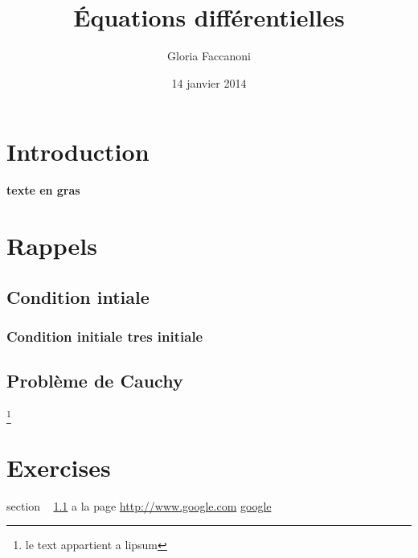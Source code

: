 \documentclass[12pt,a4paper]{scrartcl}
\title{Équations différentielles}
\author{Gloria Faccanoni}
\date{14 janvier 2014}
\begin{document}
\maketitle 

\begin{abstract} 
\lipsum[10]
\end{abstract}
\tableofcontents
\section*{Introduction}
\textbf{texte en gras}
\lipsum[1]
\section{Rappels}
\lipsum[2]
\subsection{Condition intiale}\label{subsec.toto}
\lipsum[3]
\subsubsection{Condition initiale tres initiale}
\subsection{Problème de Cauchy}
\lipsum[4]
\footnote{le text appartient a lipsum}
\section{Exercises}
\lipsum[5]
section ~ \ref{subsec.toto} a la page \pageref{subsec.toto}
\url{http://www.google.com}
\href{http://www.google.com}{google}
\end{document}
